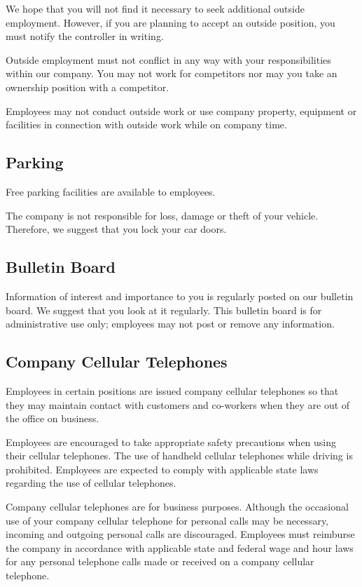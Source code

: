 \documentclass{book}
\begin{document}
We hope that you will not find it necessary to seek additional outside employment. However, if you are planning to accept an outside position, you must notify the controller in writing.

Outside employment must not conflict in any way with your responsibilities within our company. You may not work for competitors nor may you take an ownership position with a competitor.

Employees may not conduct outside work or use company property, equipment or facilities in connection with outside work while on company time.

\subsection{Parking}

Free parking facilities are available to employees.

The company is not responsible for loss, damage or theft of your vehicle. Therefore, we suggest that you lock your car doors.

\subsection{Bulletin Board}

Information of interest and importance to you is regularly posted on our bulletin board. We suggest that you look at it regularly. This bulletin board is for administrative use only; employees may not post or remove any information.

\subsection{Company Cellular Telephones}

Employees in certain positions are issued company cellular telephones so that they may maintain contact with customers and co-workers when they are out of the office on business.

Employees are encouraged to take appropriate safety precautions when using their cellular telephones. The use of handheld cellular telephones while driving is prohibited. Employees are expected to comply with applicable state laws regarding the use of cellular telephones.

Company cellular telephones are for business purposes. Although the occasional use of your company cellular telephone for personal calls may be necessary, incoming and outgoing personal calls are discouraged. Employees must reimburse the company in accordance with applicable state and federal wage and hour laws for any personal telephone calls made or received on a company cellular telephone.
\end{document}
